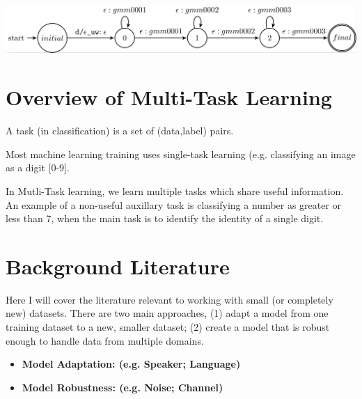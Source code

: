 \documentclass[10pt,a4paper]{article}
\begin{document}
\begin{center}
  \includegraphics[width=.9\textwidth,keepaspectratio]{figs/H-fst.png}
\end{center}











\newpage

\section{Overview of Multi-Task Learning}

A task (in classification) is a set of (data,label) pairs.

Most machine learning training uses single-task learning (e.g. classifying an image as a digit [0-9].

In Mutli-Task learning, we learn multiple tasks which share useful information. An example of a non-useful auxillary task is classifying a number as greater or less than 7, when the main task is to identify the identity of a single digit.






\newpage

\section{Background Literature}

Here I will cover the literature relevant to working with small (or completely new) datasets. There are two main approaches, (1) adapt a model from one training dataset to a new, smaller dataset; (2) create a model that is robust enough to handle data from multiple domains. 

\begin{itemize}

\item \textbf{Model Adaptation: (e.g. Speaker; Language)}

    
  
\item \textbf{Model Robustness: (e.g. Noise; Channel)}

  
\end{itemize}
\end{document}
